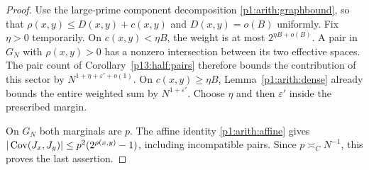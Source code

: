 \begin{proof}
Use the large-prime component decomposition
\eqref{p1:arith:graphbound}, so that
$\rho(x,y)\leq D(x,y)+c(x,y)$ and $D(x,y)=o(B)$ uniformly.
Fix $\eta>0$ temporarily.  On $c(x,y)<\eta B$, the weight is
at most $2^{\eta B+o(B)}$.  A pair in $G_N$ with $\rho(x,y)>0$
has a nonzero intersection between its two effective spaces.  The pair
count of Corollary~\ref{p13:half:pairs} therefore bounds the contribution
of this sector by $N^{1+\eta+\varepsilon'+o(1)}$.
On $c(x,y)\geq\eta B$, Lemma~\ref{p1:arith:dense} already bounds the
entire weighted sum by $N^{1+\varepsilon'}$.  Choose $\eta$ and then
$\varepsilon'$ inside the prescribed margin.

On $G_N$ both marginals are $p$.  The affine identity
\eqref{p1:arith:affine} gives
$|\operatorname{Cov}(J_x,J_y)|\leq p^2(2^{\rho(x,y)}-1)$, including incompatible
pairs.  Since $p\asymp_C N^{-1}$, this proves the last assertion.
\end{proof}


